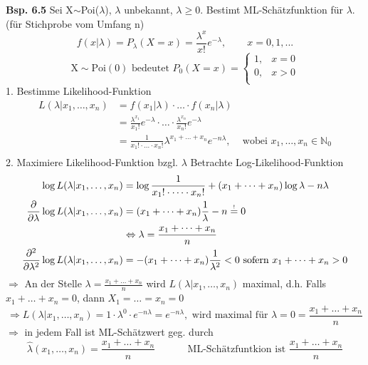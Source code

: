 \documentclass[a4paper,11pt]{article}
\begin{document}
\vspace{6pt}
\noindent\textbf{Bsp. 6.5} 
Sei X$\sim$Poi($\lambda$), $\lambda$ unbekannt, $\lambda\geq0$. Bestimt ML-Schätzfunktion für $\lambda$. (für Stichprobe vom Umfang n)
\[f(x|\lambda)=P_\lambda(X=x)=\frac{\lambda^x}{x!}e^{-\lambda}, \hspace{25pt}x=0,1,...\]
\[\text{X}\sim\text{Poi}(0) \text{ bedeutet } P_0(X=x)=\begin{cases}
1, &x=0\\
0, &x>0\\
\end{cases}\]
1. Bestimme Likelihood-Funktion
\begin{align*}
    L(\lambda|x_1,\dots,x_n) &= f(x_1|\lambda)\cdot\dots\cdot f(x_n|\lambda)\\
    &= \frac{\lambda^{x_1}}{x_1!}e^{-\lambda}\cdot\dots\cdot\frac{\lambda^{x_n}}{x_n!}e^{-\lambda}\\
    &= \frac{1}{x_1!\cdot\dots\cdot x_n!}\lambda^{x_1+\dots+x_n}e^{-n\lambda}, \hspace{10pt}\text{ wobei }x_1,\dots,x_n\in\mathbb{N}_0\\
\end{align*}
2. Maximiere Likelihood-Funktion bzgl. $\lambda$
\newline Betrachte Log-Likelihood-Funktion
\begin{align*}
    \log L(\lambda|x_1,\dots,x_n) &= \log\frac{1}{x_1!\cdot\dots\cdot x_n!}+(x_1+\dots+x_n)\log\lambda-n\lambda\\
    \frac{\partial}{\partial\lambda}\log L(\lambda|x_1,\dots,x_n) &= (x_1+\dots+x_n)\frac{1}{\lambda}-n \overset{\mathclap{\scriptscriptstyle !}}{=}0\\
    &\Leftrightarrow \lambda=\frac{x_1+\dots+x_n}{n}\\
    \frac{\partial^2}{\partial\lambda^2}\log L(\lambda|x_1,\dots,x_n) &= -(x_1+\dots+x_n)\frac{1}{\lambda^2}<0 \text{ sofern } x_1+\dots+x_n>0\\
\end{align*}
$\Rightarrow$ An der Stelle $\lambda=\frac{x_1+\dots+x_n}{n}$ wird $L(\lambda|x_1,\dots,x_n)$ maximal, d.h. 
\newline Falls $x_1+\dots+x_n=0$, dann $X_1=\dots=x_n=0$
\[\Rightarrow L(\lambda|x_1,\dots,x_n)=1\cdot\lambda^0\cdot e^{-n\lambda}=e^{-n\lambda}, \text{ wird maximal für }\lambda=0=\frac{x_1+\dots+x_n}{n}\]
\newline $\Rightarrow$ in jedem Fall ist ML-Schätzwert geg. durch
\[\hat{\lambda}(x_1,\dots,x_n)=\frac{x_1+\dots+x_n}{n}\hspace{35pt}\text{ ML-Schätzfuntkion ist }\frac{x_1+\dots+x_n}{n}\]
\end{document}
